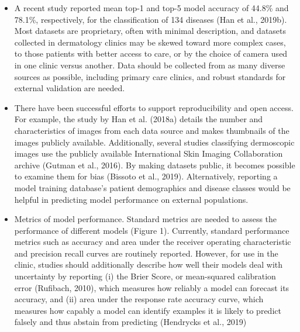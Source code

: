 \documentclass[12pt, a4paper, oneside]{book}   	%
\begin{document}
\begin{itemize}
				\item A recent study reported mean top-1 and top-5 model accuracy of 44.8\% and 78.1\%, respectively, for the classification of 134 diseases (Han et al., 2019b). Most datasets are proprietary, often with minimal description, and datasets collected in dermatology clinics may be skewed toward more complex cases, to those patients with better access to care, or by the choice of camera used in one clinic versus another. Data should be collected from as many diverse sources as possible, including primary care clinics, and robust standards for external validation are needed. \autocite{Young_2020}
				\item There have been successful efforts to support reproducibility and open access. For example, the study by Han et al. (2018a) details the number and characteristics of images from each data source and makes thumbnails of the images publicly available. Additionally, several studies classifying dermoscopic images use the publicly available International Skin Imaging Collaboration archive (Gutman et al., 2016). By making datasets public, it becomes possible to examine them for bias (Bissoto et al., 2019). Alternatively, reporting a model training database’s patient demographics and disease classes would be helpful in predicting model performance on external populations. \autocite{Young_2020}
				\item Metrics of model performance. Standard metrics are needed to assess the performance of different models (Figure 1). Currently, standard performance metrics such as accuracy and area under the receiver operating characteristic and precision recall curves are routinely reported. However, for use in the clinic, studies should additionally describe how well their models deal with uncertainty by reporting (i) the Brier Score, or mean-squared calibration error (Rufibach, 2010), which measures how reliably a model can forecast its accuracy, and (ii) area under the response rate accuracy curve, which measures how capably a model can identify examples it is likely to predict falsely and thus abstain from predicting (Hendrycks et al., 2019) \autocite{Young_2020}

\end{itemize}
\end{document}
